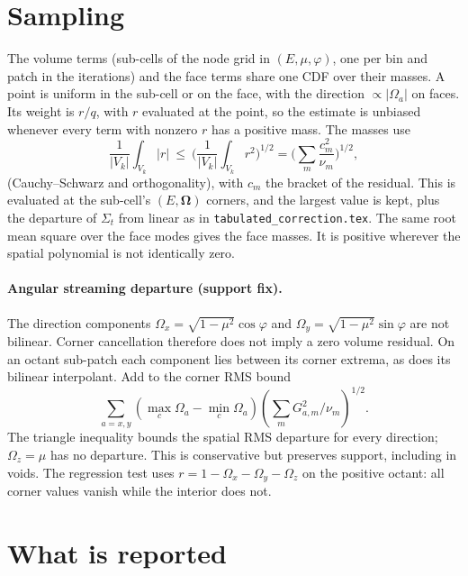 \documentclass[11pt]{article}
\newcommand{\Sigt}{\Sigma_t}
\newcommand{\Om}{\boldsymbol\Omega}
\begin{document}
\section{Sampling}

The volume terms (sub-cells of the node grid in $(E,\mu,\varphi)$, one per bin and
patch in the iterations) and the face terms share one CDF over their masses. A point
is uniform in the sub-cell or on the face, with the direction $\propto|\Omega_a|$ on
faces. Its weight is $r/q$, with $r$ evaluated at the point, so the estimate is
unbiased whenever every term with nonzero $r$ has a positive mass. The masses use
\begin{equation}
  \frac{1}{|V_k|}\int_{V_k}|r|\ \le\ \Big(\frac{1}{|V_k|}\int_{V_k}r^2\Big)^{1/2}
  = \Big(\sum_m \frac{c_m^2}{\nu_m}\Big)^{1/2},
\end{equation}
(Cauchy--Schwarz and orthogonality), with $c_m$ the bracket of the residual. This is
evaluated at the sub-cell's $(E,\Om)$ corners, and the largest value is kept, plus
the departure of $\Sigt$ from linear as in \texttt{tabulated\_correction.tex}. The
same root mean square over the face modes gives the face masses. It is positive
wherever the spatial polynomial is not identically zero.

\paragraph{Angular streaming departure (support fix).}
The direction components $\Omega_x=\sqrt{1-\mu^2}\cos\varphi$ and
$\Omega_y=\sqrt{1-\mu^2}\sin\varphi$ are not bilinear. Corner cancellation
therefore does not imply a zero volume residual. On an octant sub-patch each
component lies between its corner extrema, as does its bilinear interpolant.
Add to the corner RMS bound
\begin{equation}
 \sum_{a=x,y}(\max_c\Omega_a-\min_c\Omega_a)
 \left(\sum_m G_{a,m}^2/\nu_m\right)^{1/2}.
\end{equation}
The triangle inequality bounds the spatial RMS departure for every direction;
$\Omega_z=\mu$ has no departure. This is conservative but preserves support,
including in voids. The regression test uses $r=1-\Omega_x-\Omega_y-\Omega_z$
on the positive octant: all corner values vanish while the interior does not.

\section{What is reported}
\end{document}
